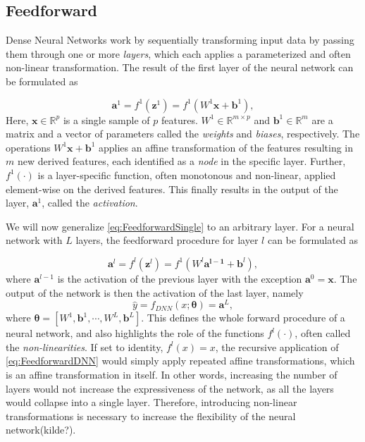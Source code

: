 \subsection{Feedforward}\label{sec:FeedforwardDNN}
Dense Neural Networks work by sequentially transforming input data by passing them through one or more \emph{layers}, which each applies a parameterized and often non-linear transformation. The result of the first layer of the neural network can be formulated as

\begin{equation}\label{eq:FeedforwardSingle}
    \boldsymbol{a}^1 = f^1(\boldsymbol{z}^1) = f^1(W^1 \boldsymbol{x} + \boldsymbol{b}^1),
\end{equation}
Here, $\boldsymbol{x} \in \mathbb{R}^p$ is a single sample of $p$ features. $W^1 \in \mathbb{R}^{m \times p}$ and $\boldsymbol{b}^1 \in \mathbb{R}^{m}$ are a matrix and a vector of parameters called the \emph{weights} and \emph{biases}, respectively. The operations $W^1 \boldsymbol{x} + \boldsymbol{b}^1$ applies an affine transformation of the features resulting in $m$ new derived features, each identified as a \emph{node} in the specific layer. Further, $f^1(\cdot)$ is a layer-specific function, often monotonous and non-linear, applied element-wise on the derived features. This finally results in the output of the layer, $\boldsymbol{a}^1$, called the \emph{activation}.

We will now generalize \autoref{eq:FeedforwardSingle} to an arbitrary layer. For a neural network with $L$ layers, the feedforward procedure for layer $l$  can be formulated as 

\begin{equation}\label{eq:FeedforwardDNN}
    \boldsymbol{a}^l = f^l(\boldsymbol{z}^l) = f^1(W^l \boldsymbol{a^{l-1}} + \boldsymbol{b}^l),
\end{equation}
where $\boldsymbol{a}^{l-1}$ is the activation of the previous layer with the exception $\boldsymbol{a}^{0} = \boldsymbol{x}$. The output of the network is then the activation of the last layer, namely 
\begin{equation}\label{eq:DNN}
    \hat{y} = f_{DNN}(x;\boldsymbol{\theta}) = \boldsymbol{a}^{L},
\end{equation}
where $\boldsymbol{\theta} = [W^1, \boldsymbol{b}^1, \cdots, W^L,  \boldsymbol{b}^L]$. This defines the whole forward procedure of a neural network, and also highlights the role of the functions $f^l(\cdot)$, often called the \emph{non-linearities}. If set to identity, $f^l(x) = x$, the recursive application of \autoref{eq:FeedforwardDNN} would simply apply repeated affine transformations, which is an affine transformation in itself. In other words, increasing the number of layers would not increase the expressiveness of the network, as all the layers would collapse into a single layer. Therefore, introducing non-linear transformations is necessary to increase the flexibility of the neural network(kilde?). 

